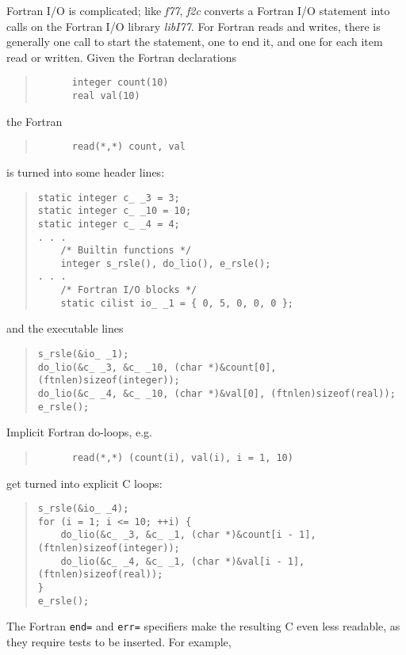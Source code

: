 \documentclass[10pt,a4paper]{article}
\begin{document}
Fortran I/O is complicated; like \emph{f77}, \emph{f2c} converts a Fortran I/O statement into calls on the Fortran I/O library \emph{libI77}. For Fortran reads and writes, there is generally one call to start the statement, one to end it, and one for each item read or written. Given the Fortran declarations
\begin{quote}
\begin{verbatim}
      integer count(10)
      real val(10)
\end{verbatim}
\end{quote}
the Fortran
\begin{quote}
\begin{verbatim}
      read(*,*) count, val
\end{verbatim}
\end{quote}
is turned into some header lines:
\begin{quote}
\begin{verbatim}
static integer c_ _3 = 3;
static integer c_ _10 = 10;
static integer c_ _4 = 4;
. . .
    /* Builtin functions */
    integer s_rsle(), do_lio(), e_rsle();
. . .
    /* Fortran I/O blocks */
    static cilist io_ _1 = { 0, 5, 0, 0, 0 };
\end{verbatim}
\end{quote}
and the executable lines
\begin{quote}
\begin{verbatim}
s_rsle(&io_ _1);
do_lio(&c_ _3, &c_ _10, (char *)&count[0], (ftnlen)sizeof(integer));
do_lio(&c_ _4, &c_ _10, (char *)&val[0], (ftnlen)sizeof(real));
e_rsle();
\end{verbatim}
\end{quote}
Implicit Fortran do-loops, e.g.
\begin{quote}
\begin{verbatim}
      read(*,*) (count(i), val(i), i = 1, 10)
\end{verbatim}
\end{quote}
get turned into explicit C loops:
\begin{quote}
\begin{verbatim}
s_rsle(&io_ _4);
for (i = 1; i <= 10; ++i) {
    do_lio(&c_ _3, &c_ _1, (char *)&count[i - 1], (ftnlen)sizeof(integer));
    do_lio(&c_ _4, &c_ _1, (char *)&val[i - 1], (ftnlen)sizeof(real));
}
e_rsle();
\end{verbatim}
\end{quote}
The Fortran \verb|end=| and \verb|err=| specifiers make the resulting C even less readable, as they require tests to be inserted. For example,
\end{document}
